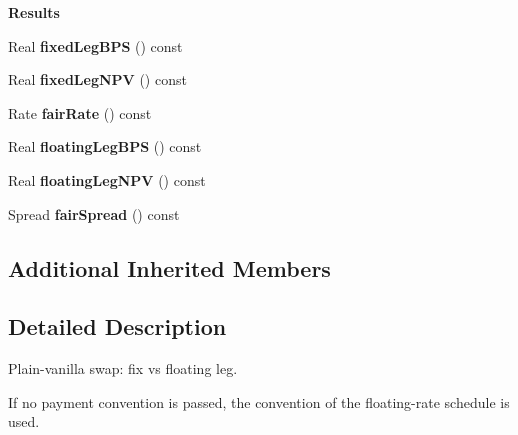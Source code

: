 \begin{Indent}{\bf Results}\par
\begin{DoxyCompactItemize}
\item 
Real {\bfseries fixed\+Leg\+B\+PS} () const \label{class_quant_lib_1_1_vanilla_swap_a8789789051eee381d613b7c899288925}

\item 
Real {\bfseries fixed\+Leg\+N\+PV} () const \label{class_quant_lib_1_1_vanilla_swap_ac0af2773551f26aae202ede3ea478f16}

\item 
Rate {\bfseries fair\+Rate} () const \label{class_quant_lib_1_1_vanilla_swap_a7fe4ec4bba72f47b3fbef929146a7e56}

\item 
Real {\bfseries floating\+Leg\+B\+PS} () const \label{class_quant_lib_1_1_vanilla_swap_a3c71480f40a0c10922c6016f2f6413c1}

\item 
Real {\bfseries floating\+Leg\+N\+PV} () const \label{class_quant_lib_1_1_vanilla_swap_a87d1df8f564b6e2b9c66e2ec3db49ca1}

\item 
Spread {\bfseries fair\+Spread} () const \label{class_quant_lib_1_1_vanilla_swap_a9e74c2d4e9396aeb2345b5613da08420}

\end{DoxyCompactItemize}
\end{Indent}
\subsection*{Additional Inherited Members}


\subsection{Detailed Description}
Plain-\/vanilla swap\+: fix vs floating leg. 

If no payment convention is passed, the convention of the floating-\/rate schedule is used.

